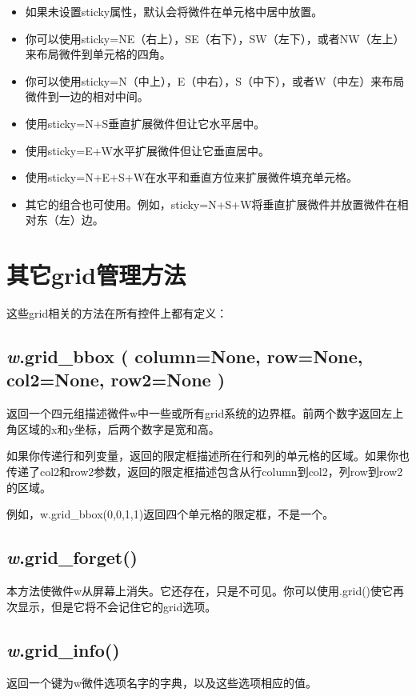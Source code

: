 \begin{itemize}
\item 如果未设置sticky属性，默认会将微件在单元格中居中放置。

\item 你可以使用sticky=NE（右上），SE（右下），SW（左下），或者NW（左上）来布局微件到单元格的四角。

\item 你可以使用sticky=N（中上），E（中右），S（中下），或者W（中左）来布局微件到一边的相对中间。

\item 使用sticky=N+S垂直扩展微件但让它水平居中。

\item 使用sticky=E+W水平扩展微件但让它垂直居中。

\item 使用sticky=N+E+S+W在水平和垂直方位来扩展微件填充单元格。

\item 其它的组合也可使用。例如，sticky=N+S+W将垂直扩展微件并放置微件在相对东（左）边。
\end{itemize}

\section{其它grid管理方法}
这些grid相关的方法在所有控件上都有定义：
\subsection*{\textsf{\textit{w}.grid\_bbox ( column=None, row=None, col2=None, row2=None )}}
\par{返回一个四元组描述微件w中一些或所有grid系统的边界框。前两个数字返回左上角区域的x和y坐标，后两个数字是宽和高。}
\par{如果你传递行和列变量，返回的限定框描述所在行和列的单元格的区域。如果你也传递了col2和row2参数，返回的限定框描述包含从行column到col2，列row到row2的区域。}
\par{例如，w.grid\_bbox(0,0,1,1)返回四个单元格的限定框，不是一个。}

\subsection*{\textsf{\textit{w}.grid\_forget()}}
\par{本方法使微件w从屏幕上消失。它还存在，只是不可见。你可以使用.grid()使它再次显示，但是它将不会记住它的grid选项。}

\subsection*{\textsf{\textit{w}.grid\_info()}}
\par{返回一个键为w微件选项名字的字典，以及这些选项相应的值。}

